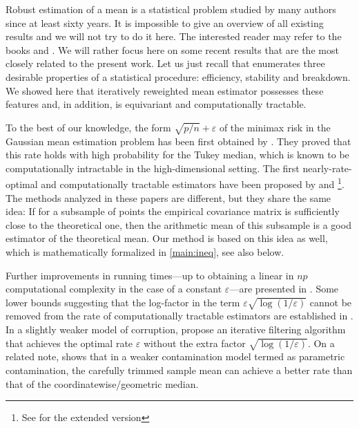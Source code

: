 \documentclass[aos,preprint,reqno]{imsart}
\theoremstyle{plain}
\theoremstyle{remark}
\begin{document}
	Robust estimation of a mean is a statistical problem
	studied by many authors since at least sixty years. 
	It is impossible to give an overview of all existing 
	results and we will not try to do it here. The interested
	reader may refer to the books \citep{maronna2006robust} 
	and \citep{Huber2009}. We will rather focus here on some 
	recent results that are the most closely related to the present
	work. Let us just recall that \cite{Huber2009} enumerates
	three desirable properties of a statistical procedure: 
	efficiency, stability and breakdown. We showed here that
	iteratively reweighted mean estimator possesses these features and, 
	in addition, is equivariant and computationally tractable.
	
	To the best of our knowledge, the form $\sqrt{p/n} + 
	\varepsilon$ of the minimax risk in the Gaussian mean 
	estimation problem has been first obtained by \cite{chen2018}. 
	They proved that this rate holds with high probability 
	for the Tukey median, which is known to be computationally 
	intractable in the high-dimensional setting. 
	The first nearly-rate-optimal and computationally tractable
	estimators have been proposed by \cite{LaiRV16} and
	\cite{DiakonikolasKK016}\footnote{See \citep{DiakonikolasKKL19} 
	for the extended version}. The methods analyzed in these
	papers are different, but they share the same idea: If for 
	a subsample of points the empirical covariance matrix is
	sufficiently close to the theoretical one, then the 
	arithmetic mean of this subsample is a good estimator
	of the theoretical mean. Our method is based on this 
	idea as well, which is mathematically formalized in
	\eqref{main:ineq}, see also  below. 
	
	Further improvements in running times---up to obtaining a
	linear in $np$ computational comp\-lexity in the case of a 
	constant $\varepsilon$---are presented in \citep{Cheng19}. 
	Some lower bounds suggesting that the log-factor in the term 
	$\varepsilon\sqrt{\log(1/\varepsilon)}$ cannot be removed 
	from the rate of computationally tractable estimators 
	are established in \citep{DiakonikolasKS17}. In a slightly 
	weaker model of corruption, \cite{DiakonikolasKK018} 
	propose an iterative filtering algorithm that achieves 
	the optimal rate $\varepsilon$ without the extra factor
	$\sqrt{\log(1/\varepsilon)}$. On a related note, \citep{coldal} 
	shows that in a weaker contamination model termed as parametric
	contamination, the carefully trimmed sample mean can achieve a better
	rate than that of the coordinatewise/geometric median. 
	
\end{document}
